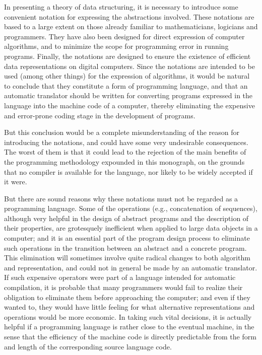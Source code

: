 In presenting a theory of data structuring, it is necessary to introduce some convenient notation for expressing the abstractions involved. These notations are based to a large extent on those already familiar to mathematicians, logicians and programmers. They have also been designed for direct expression of computer algorithms, and to minimize the scope for programming error in running programs. Finally, the notations are designed to ensure the existence of efficient data representations on digital computers. Since the notations are intended to be used (among other things) for the expression of algorithms, it would be natural to conclude that they constitute a form of programming language, and that an automatic translator should be written for converting programs expressed in the language into the machine code of a computer, thereby eliminating the expensive and error-prone coding stage in the development of programs.

But this conclusion would be a complete misunderstanding of the reason for introducing the notations, and could have some very undesirable consequences. The worst of them is that it could lead to the rejection of the main benefits of the programming methodology expounded in this monograph, on the grounds that no compiler is available for the language, nor likely to be widely accepted if it were.

But there are sound reasons why these notations must not be regarded as a programming language. Some of the operations (e.g., concatenation of sequences), although very helpful in the design of abstract programs and the description of their properties, are grotesquely inefficient when applied to large data objects in a computer; and it is an essential part of the program design process to eliminate such operations in the transition between an abstract and a concrete program. This elimination will sometimes involve quite radical changes to both algorithm and representation, and could not in general be made by an automatic translator. If such expensive operators were part of a language intended for automatic compilation, it is probable that many programmers would fail to realize their obligation to eliminate them before approaching the computer; and even if they wanted to, they would have little feeling for what alternative representations and operations would be more economic. In taking such vital decisions, it is actually helpful if a programming language is rather close to the eventual machine, in the sense that the efficiency of the machine code is directly predictable from the form and length of the corresponding source language code.

